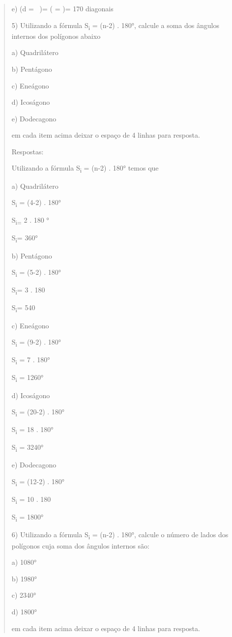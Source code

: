 \begin{quote}
\begin{escolha}
e) (d = \ )=
( = )= 170 diagonais

5) Utilizando a fórmula S\textsubscript{i} = (n-2) . 180°, calcule a
soma dos ângulos internos dos polígonos abaixo

a) Quadrilátero

b) Pentágono

c) Eneágono

d) Icoságono

e) Dodecagono

em cada item acima deixar o espaço de 4 linhas para resposta.

Respostas:

Utilizando a fórmula S\textsubscript{i} = (n-2) . 180° temos que

a) Quadrilátero

S\textsubscript{i} = (4-2) . 180°

S\textsubscript{i=} 2 . 180 °

S\textsubscript{i}= 360°

b) Pentágono

S\textsubscript{i} = (5-2) . 180°

S\textsubscript{i}= 3 . 180

S\textsubscript{i}= 540

c) Eneágono

S\textsubscript{i} = (9-2) . 180°

S\textsubscript{i} = 7 . 180°

S\textsubscript{i} = 1260°

d) Icoságono

S\textsubscript{i} = (20-2) . 180°

S\textsubscript{i} = 18 . 180°

S\textsubscript{i} = 3240°

e) Dodecagono

S\textsubscript{i} = (12-2) . 180°

S\textsubscript{i} = 10 . 180

S\textsubscript{i} = 1800°

6) Utilizando a fórmula S\textsubscript{i} = (n-2) . 180°, calcule o
número de lados dos polígonos cuja soma dos ângulos internos são:

a) 1080°

b) 1980°

c) 2340°

d) 1800°

em cada item acima deixar o espaço de 4 linhas para resposta.


\end{escolha}
\end{quote}

